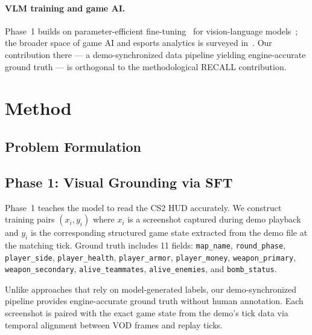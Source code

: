 \documentclass{article}
\begin{document}
\paragraph{VLM training and game AI.} Phase~1 builds on parameter-efficient fine-tuning~\cite{hu2022lora} for vision-language models~\cite{bai2023qwen,liu2023visual}; the broader space of game AI and esports analytics is surveyed in~\cite{chen2024game,huang2022strategic}. Our contribution there --- a demo-synchronized data pipeline yielding engine-accurate ground truth --- is orthogonal to the methodological RECALL contribution.

\section{Method}
\label{sec:method}


\subsection{Problem Formulation}
\label{sec:problem}


\subsection{Phase 1: Visual Grounding via SFT}
\label{sec:sft}

Phase~1 teaches the model to read the CS2 HUD accurately. We construct training pairs $(x_i, y_i)$ where $x_i$ is a screenshot captured during demo playback and $y_i$ is the corresponding structured game state extracted from the demo file at the matching tick. Ground truth includes 11 fields: \texttt{map\_name}, \texttt{round\_phase}, \texttt{player\_side}, \texttt{player\_health}, \texttt{player\_armor}, \texttt{player\_money}, \texttt{weapon\_primary}, \texttt{weapon\_secondary}, \texttt{alive\_teammates}, \texttt{alive\_enemies}, and \texttt{bomb\_status}.

Unlike approaches that rely on model-generated labels, our demo-synchronized pipeline provides engine-accurate ground truth without human annotation. Each screenshot is paired with the exact game state from the demo's tick data via temporal alignment between VOD frames and replay ticks.
\end{document}
